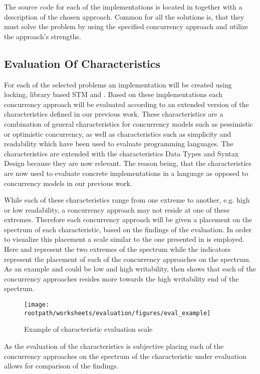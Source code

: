 The source code for each of the implementations is located in \bsref{} together with a description of the chosen approach. Common for all the solutions is, that they must solve the problem by using the specified concurrency approach and utilize the approach's strengths.

\subsection{Evaluation Of Characteristics}\label{sec:eval_chars}
For each of the selected problems an implementation will be created using locking, library based \ac{STM} and \stmname. Based on these implementations each concurrency approach will be evaluated according to an extended version of the characteristics defined in our previous work\cite[p. 15-21]{dpt907e14trending}. These characteristics are a combination of general characteristics for concurrency models such as pessimistic or optimistic concurrency, as well as characteristics such as simplicity and readability which have been used to evaluate programming languages\cite[p. 7]{sebestaProLang}. The characteristics are extended with the characteristics Data Types and Syntax Design because they are now relevant. The reason being, that the characteristics are now used to evaluate concrete implementations in a language as opposed to concurrency models in our previous work\cite{dpt907e14trending}.

While each of these characteristics range from one extreme to another, e.g. high or low readability, a concurrency approach may not reside at one of these extremes. Therefore each concurrency approach will be given a placement on the spectrum of each characteristic, based on the findings of the evaluation. In order to visualize this placement a scale similar to the one presented in  is employed. Here  and  represent the two extremes of the spectrum while the indicators represent the placement of each of the concurrency approaches on the spectrum. As an example  and  could be low and high writability,  then shows that each of the concurrency approaches resides more towards the high writability end of the spectrum.
\begin{figure}[ht!]
\centering
\texttt{[image: \\rootpath/worksheets/evaluation/figures/eval\_example]}
\caption{Example of characteristic evaluation scale}\label{fig:evel_example}
\end{figure}
As the evaluation of the characteristics is subjective placing each of the concurrency approaches on the spectrum of the characteristic under evaluation allows for comparison of the findings.

\worksheetend